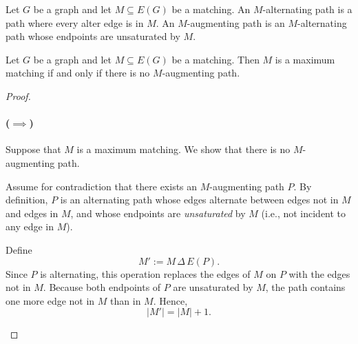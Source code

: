 \begin{definition}
    Let \(G\) be a graph and let \(M \subseteq E(G)\) be a matching. An \(M\)-alternating path is a path where every alter edge is in \(M\). An \(M\)-augmenting path is an \(M\)-alternating path whose endpoints are unsaturated by \(M\).       
\end{definition}

\begin{theorem}[Berge, 1953]
Let \( G \) be a graph and let \( M \subseteq E(G) \) be a matching. Then \( M \) is a maximum matching if and only if there is no \( M \)-augmenting path.
\end{theorem}

\begin{proof}
\hfill

\paragraph{(\(\implies\))} 
Suppose that \( M \) is a maximum matching. We show that there is no \( M \)-augmenting path.

Assume for contradiction that there exists an \( M \)-augmenting path \( P \). By definition, \( P \) is an alternating path whose edges alternate between edges not in \( M \) and edges in \( M \), and whose endpoints are \emph{unsaturated} by \( M \) (i.e., not incident to any edge in \( M \)).

Define
\[
M' := M \,\Delta\, E(P).
\]
Since \( P \) is alternating, this operation replaces the edges of \( M \) on \( P \) with the edges not in \( M \). Because both endpoints of \( P \) are unsaturated by \( M \), the path contains one more edge not in \( M \) than in \( M \). Hence,
\[
|M'| = |M| + 1.
\]

\begin{center}
\end{center}
\end{proof}
